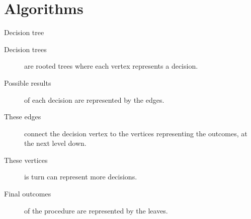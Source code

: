 
\section{Algorithms}

\begin{frame}{Decision tree}
  \begin{description}
    \item[Decision trees] are rooted trees where each vertex represents a decision.
    \vspace{2mm}
    \item[Possible results] of each decision are represented by the edges.
    \vspace{2mm}
    \item[These edges] connect the decision vertex to the vertices representing the outcomes, at the next level down.
    \vspace{2mm}
    \item[These vertices] is turn can represent more decisions.
    \vspace{2mm}
    \item[Final outcomes] of the procedure are represented by the leaves.
  \end{description}
\end{frame}

